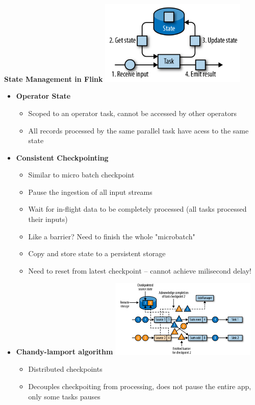 \documentclass[10pt, landscape]{article}
\begin{document}
\begin{multicols}{4}
\textbf{State Management in Flink}
\includegraphics*[width=7cm]{flink_state.png}
\begin{itemize}
  \item \textbf{Operator State}
  \begin{itemize}
    \item Scoped to an operator task, cannot be accessed by other operators
    \item All records processed by the same parallel task have acess to the same state 
  \end{itemize}
  \item \textbf{Consistent Checkpointing}
  \begin{itemize}
    \item Similar to micro batch checkpoint 
    \item Pause the ingestion of all input streams 
    \item Wait for in-flight data to be completely processed (all tasks processed their inputs)
    \item Like a barrier? Need to finish the whole "microbatch"
    \item Copy and store state to a persistent storage
    \item Need to reset from latest checkpoint -- cannot achieve milisecond delay!
  \end{itemize}
  \item \textbf{Chandy-lamport algorithm}
  \includegraphics*[width=7cm]{checkpoint_flink.png}
  \begin{itemize}
    \item Distributed checkpoints
    \item Decouples checkpoiting from processing, does not pause the entire app, only some tasks pauses 

\end{itemize}
\end{itemize}
\end{multicols}
\end{document}
